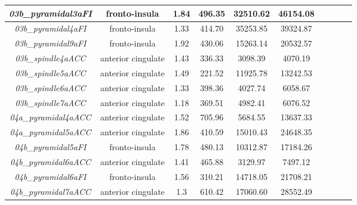 \begin{longtable}{|c|c|c|c|c|c|c|c|c|c|}
	\textit{03b\_pyramidal3aFI}   & fronto-insula      & 1.84                      & 496.35                    & 32510.62                  & 46154.08                  \\ \hline
	\textit{03b\_pyramidal4aFI}   & fronto-insula      & 1.33                      & 414.70                    & 35253.85                  & 39324.87                  \\ \hline
	\textit{03b\_pyramidal9aFI}   & fronto-insula      & 1.92                      & 430.06                    & 15263.14                  & 20532.57                  \\ \hline
	\textit{03b\_spindle4aACC}    & anterior cingulate & 1.43                      & 336.33                    & 3098.39                   & 4070.19                   \\ \hline
	\textit{03b\_spindle5aACC}    & anterior cingulate & 1.49                      & 221.52                    & 11925.78                  & 13242.53                  \\ \hline
	\textit{03b\_spindle6aACC}    & anterior cingulate & 1.33                      & 398.36                    & 4027.74                   & 6058.67                   \\ \hline
	\textit{03b\_spindle7aACC}    & anterior cingulate & 1.18                      & 369.51                    & 4982.41                   & 6076.52                   \\ \hline
	\textit{04a\_pyramidal4aACC}  & anterior cingulate & 1.52                      & 705.96                    & 5684.55                   & 13637.33                  \\ \hline
	\textit{04a\_pyramidal5aACC}  & anterior cingulate & 1.86                      & 410.59                    & 15010.43                  & 24648.35                  \\ \hline
	\textit{04b\_pyramidal5aFI}   & fronto-insula      & 1.78                      & 480.13                    & 10312.87                  & 17184.26                  \\ \hline
	\textit{04b\_pyramidal6aACC}  & anterior cingulate & 1.41                      & 465.88                    & 3129.97                   & 7497.12                   \\ \hline
	\textit{04b\_pyramidal6aFI}   & fronto-insula      & 1.56                      & 310.21                    & 14718.05                  & 21708.21                  \\ \hline
	\textit{04b\_pyramidal7aACC}  & anterior cingulate & 1.3                       & 610.42                    & 17060.60                  & 28552.49                  \\ \hline

\end{longtable}
